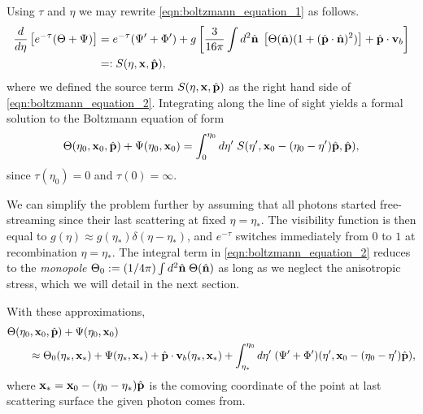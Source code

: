 Using $\tau$ and $\eta$ we may rewrite \eqref{eqn:boltzmann_equation_1} as follows.
\begin{align}
	\frac{d}{d\eta} \left[ e^{-\tau} (\Theta + \Psi) \right] &= e^{-\tau}(\Psi' + \Phi') + g \left[ \frac{3}{16\pi} \int d^2\hat{\mathbf{n}} \; \left[ \Theta(\hat{\mathbf{n}}) (1 + (\hat{\mathbf{p}} \cdot \hat{\mathbf{n}})^2) \right] + \hat{\mathbf{p}} \cdot \mathbf{v}_b \right] \label{eqn:boltzmann_equation_2} \\
	&=: S(\eta, \mathbf{x}, \hat{\mathbf{p}}), \label{def:boltzmann_source_term}
\end{align}
where we defined the source term $S(\eta,\mathbf{x},\hat{\mathbf{p}})$ as the right hand side of \eqref{eqn:boltzmann_equation_2}. Integrating along the line of sight yields a formal solution to the Boltzmann equation of form
\begin{align}
	\Theta(\eta_0, \mathbf{x}_0, \hat{\mathbf{p}}) + \Psi(\eta_0, \mathbf{x}_0) = \int_0^{\eta_0} d\eta' \; S(\eta', \mathbf{x}_0 - (\eta_0 -\eta') \hat{\mathbf{p}}, \hat{\mathbf{p}}), 
\end{align}
since $\tau(\eta_0)=0$ and $\tau(0) = \infty$.

We can simplify the problem further by assuming that all photons started free-streaming since their last scattering at fixed $\eta=\eta_*$. The visibility function is then equal to $g(\eta)\approx g(\eta_*)\delta(\eta-\eta_*)$, and $e^{-\tau}$ switches immediately from $0$ to $1$ at recombination $\eta=\eta_*$. The integral term in \eqref{eqn:boltzmann_equation_2} reduces to the \textit{monopole} $\Theta_0 := (1/4\pi)\int d^2\hat{\mathbf{n}} \;\Theta(\hat{\mathbf{n}})$ as long as we neglect the anisotropic stress, which we will detail in the next section. 

With these approximations,
\begin{align}
	&\Theta(\eta_0, \mathbf{x}_0, \hat{\mathbf{p}}) + \Psi(\eta_0, \mathbf{x}_0) \nonumber \\
	&\qquad \approx \Theta_0(\eta_*, \mathbf{x}_*) + \Psi(\eta_*, \mathbf{x}_*) + \hat{\mathbf{p}}\cdot \mathbf{v}_b (\eta_*, \mathbf{x}_*) + \int_{\eta_*}^{\eta_0} d\eta' \; (\Psi' + \Phi')(\eta', \mathbf{x}_0-(\eta_0-\eta')\hat{\mathbf{p}}), \label{eqn:line_of_sight_solution_approximated}
\end{align}
where $\mathbf{x}_* = \mathbf{x}_0-(\eta_0-\eta_*)\hat{\mathbf{p}}$ is the comoving coordinate of the point at last scattering surface the given photon comes from.

